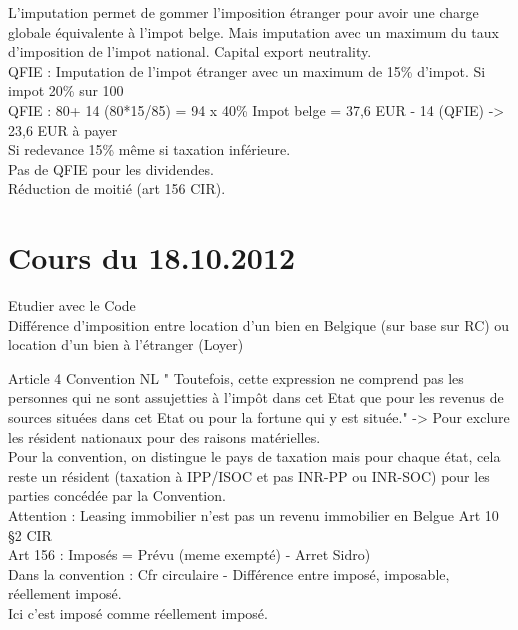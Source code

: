 \documentclass{book}
\begin{document}
L'imputation permet de gommer l'imposition étranger pour avoir une charge globale équivalente à l'impot belge. Mais imputation avec un maximum du taux d'imposition de l'impot national. Capital export neutrality.\\

QFIE : Imputation de l'impot étranger avec un maximum de 15\% d'impot. Si impot 20\% sur 100 \\

QFIE : 80+ 14 (80*15/85) = 94 x 40\% Impot belge = 37,6 EUR - 14 (QFIE) -> 23,6 EUR à payer  \\

Si redevance 15\% même si taxation inférieure.\\

Pas de QFIE pour les dividendes.\\

Réduction de moitié (art 156 CIR).


\chapter{Cours du 18.10.2012}

Etudier avec le Code\\

Différence d'imposition entre location d'un bien en Belgique (sur base sur RC) ou location d'un bien à l'étranger (Loyer)


Article 4 Convention NL " Toutefois, cette expression ne comprend pas les personnes qui ne sont assujetties à l'impôt dans cet Etat que pour les revenus de sources situées dans cet Etat ou pour la fortune qui y est située." -> Pour exclure les résident nationaux pour des raisons matérielles.\\

Pour la convention, on distingue le pays de taxation mais pour chaque état, cela reste un résident (taxation à IPP/ISOC et pas INR-PP ou INR-SOC) pour les parties concédée par la Convention.\\

Attention : Leasing immobilier n'est pas un revenu immobilier en Belgue Art 10 §2 CIR\\

Art 156 : Imposés = Prévu (meme exempté) - Arret Sidro)\\
Dans la convention : Cfr circulaire - Différence entre imposé, imposable, réellement imposé.\\
Ici c'est imposé comme réellement imposé.\\
\end{document}
